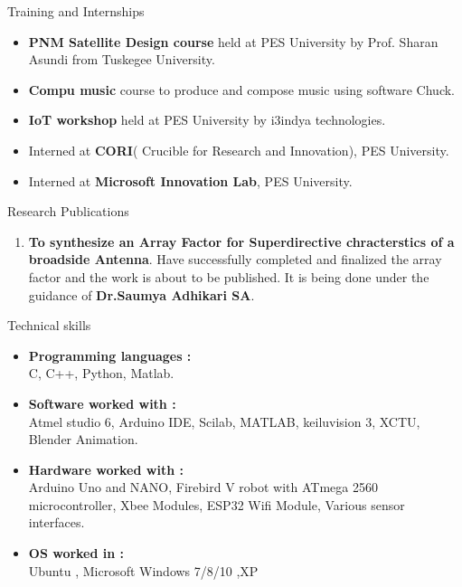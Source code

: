 \documentclass{resume} %
\begin{document}
\vskip 0.5in

\begin{rSection}{Training and Internships}
\begin{itemize}
    \item {\bf PNM Satellite Design course} held at PES University by Prof. Sharan Asundi from Tuskegee University.
    \item {\bf Compu music} course to produce and compose music using software Chuck.
    \item {\bf IoT workshop} held at PES University by i3indya technologies.
    \item Interned at {\bf CORI}( Crucible for Research and Innovation), PES University.
    \item Interned at {\bf Microsoft Innovation Lab}, PES University.\\

\end{itemize}
\end{rSection}

\vskip 0.5in

\begin{rSection}{Research Publications}
\begin{enumerate}
    \item {\bf To synthesize an Array Factor for Superdirective chracterstics of a broadside Antenna}. Have successfully completed and finalized the array factor and the work is about to be published. It is being done under the guidance of {\bf Dr.Saumya Adhikari SA}.\\
\end{enumerate}
\end{rSection}

\pagebreak

\begin{rSection}{Technical skills}
\begin{itemize}
    \item {\bf Programming languages :} \\
     C, C++, Python, Matlab.
     \item {\bf Software worked with :} \\
     Atmel studio 6, Arduino IDE, Scilab, MATLAB, keiluvision 3, XCTU, Blender Animation.
     \item {\bf Hardware worked with :} \\
     Arduino Uno and NANO, Firebird V robot with ATmega 2560 microcontroller, Xbee Modules, ESP32 Wifi Module, Various sensor interfaces.
     
     \item {\bf OS worked in :} \\
     Ubuntu , Microsoft Windows 7/8/10 ,XP
\end{itemize}
\end{rSection}
\end{document}
